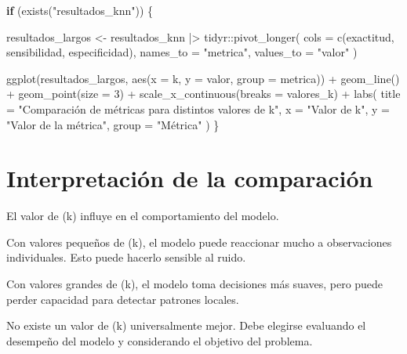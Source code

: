 \documentclass[
  11pt,
  letterpaper,
]{book}
\newenvironment{Shaded}{\begin{snugshade}}{\end{snugshade}}
\newcommand{\AttributeTok}[1]{\textcolor[rgb]{0.40,0.45,0.13}{#1}}
\newcommand{\ControlFlowTok}[1]{\textcolor[rgb]{0.00,0.23,0.31}{\textbf{#1}}}
\newcommand{\DecValTok}[1]{\textcolor[rgb]{0.68,0.00,0.00}{#1}}
\newcommand{\FunctionTok}[1]{\textcolor[rgb]{0.28,0.35,0.67}{#1}}
\newcommand{\NormalTok}[1]{\textcolor[rgb]{0.00,0.23,0.31}{#1}}
\newcommand{\OtherTok}[1]{\textcolor[rgb]{0.00,0.23,0.31}{#1}}
\newcommand{\SpecialCharTok}[1]{\textcolor[rgb]{0.37,0.37,0.37}{#1}}
\newcommand{\StringTok}[1]{\textcolor[rgb]{0.13,0.47,0.30}{#1}}
\begin{document}
\begin{Shaded}
\begin{Highlighting}[]
\ControlFlowTok{if}\NormalTok{ (}\FunctionTok{exists}\NormalTok{(}\StringTok{"resultados\_knn"}\NormalTok{)) \{}

\NormalTok{  resultados\_largos }\OtherTok{\textless{}{-}}\NormalTok{ resultados\_knn }\SpecialCharTok{|\textgreater{}}
\NormalTok{    tidyr}\SpecialCharTok{::}\FunctionTok{pivot\_longer}\NormalTok{(}
      \AttributeTok{cols =} \FunctionTok{c}\NormalTok{(exactitud, sensibilidad, especificidad),}
      \AttributeTok{names\_to =} \StringTok{"metrica"}\NormalTok{,}
      \AttributeTok{values\_to =} \StringTok{"valor"}
\NormalTok{    )}

  \FunctionTok{ggplot}\NormalTok{(resultados\_largos, }\FunctionTok{aes}\NormalTok{(}\AttributeTok{x =}\NormalTok{ k, }\AttributeTok{y =}\NormalTok{ valor, }\AttributeTok{group =}\NormalTok{ metrica)) }\SpecialCharTok{+}
    \FunctionTok{geom\_line}\NormalTok{() }\SpecialCharTok{+}
    \FunctionTok{geom\_point}\NormalTok{(}\AttributeTok{size =} \DecValTok{3}\NormalTok{) }\SpecialCharTok{+}
    \FunctionTok{scale\_x\_continuous}\NormalTok{(}\AttributeTok{breaks =}\NormalTok{ valores\_k) }\SpecialCharTok{+}
    \FunctionTok{labs}\NormalTok{(}
      \AttributeTok{title =} \StringTok{"Comparación de métricas para distintos valores de k"}\NormalTok{,}
      \AttributeTok{x =} \StringTok{"Valor de k"}\NormalTok{,}
      \AttributeTok{y =} \StringTok{"Valor de la métrica"}\NormalTok{,}
      \AttributeTok{group =} \StringTok{"Métrica"}
\NormalTok{    )}
\NormalTok{\}}
\end{Highlighting}
\end{Shaded}

\section{Interpretación de la
comparación}\label{interpretaciuxf3n-de-la-comparaciuxf3n}

El valor de (k) influye en el comportamiento del modelo.

Con valores pequeños de (k), el modelo puede reaccionar mucho a
observaciones individuales. Esto puede hacerlo sensible al ruido.

Con valores grandes de (k), el modelo toma decisiones más suaves, pero
puede perder capacidad para detectar patrones locales.

No existe un valor de (k) universalmente mejor. Debe elegirse evaluando
el desempeño del modelo y considerando el objetivo del problema.
\end{document}
